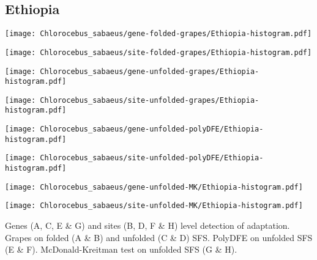 \documentclass{article}
\begin{document}
\pagebreak
\subsection{Ethiopia}
\centering
\begin{minipage}{0.49\linewidth}
    \texttt{[image: Chlorocebus\_sabaeus/gene-folded-grapes/Ethiopia-histogram.pdf]}
\end{minipage}%
\hfill
\begin{minipage}{0.49\linewidth}
    \texttt{[image: Chlorocebus\_sabaeus/site-folded-grapes/Ethiopia-histogram.pdf]}
\end{minipage}
\hfill
\begin{minipage}{0.49\linewidth}
    \texttt{[image: Chlorocebus\_sabaeus/gene-unfolded-grapes/Ethiopia-histogram.pdf]}
\end{minipage}%
\hfill
\begin{minipage}{0.49\linewidth}
    \texttt{[image: Chlorocebus\_sabaeus/site-unfolded-grapes/Ethiopia-histogram.pdf]}
\end{minipage}
\hfill
\begin{minipage}{0.49\linewidth}
    \texttt{[image: Chlorocebus\_sabaeus/gene-unfolded-polyDFE/Ethiopia-histogram.pdf]}
\end{minipage}%
\hfill
\begin{minipage}{0.49\linewidth}
    \texttt{[image: Chlorocebus\_sabaeus/site-unfolded-polyDFE/Ethiopia-histogram.pdf]}
\end{minipage}
\hfill
\begin{minipage}{0.49\linewidth}
    \texttt{[image: Chlorocebus\_sabaeus/gene-unfolded-MK/Ethiopia-histogram.pdf]}
\end{minipage}%
\hfill
\begin{minipage}{0.49\linewidth}
    \texttt{[image: Chlorocebus\_sabaeus/site-unfolded-MK/Ethiopia-histogram.pdf]}
\end{minipage}
\hfill
\flushleft
Genes (A, C, E \& G) and sites (B, D, F \& H) level detection of adaptation.
Grapes on folded (A \& B) and unfolded (C \& D) SFS.
PolyDFE on unfolded SFS (E \& F).
McDonald-Kreitman test on unfolded SFS (G \& H).
\end{document}
